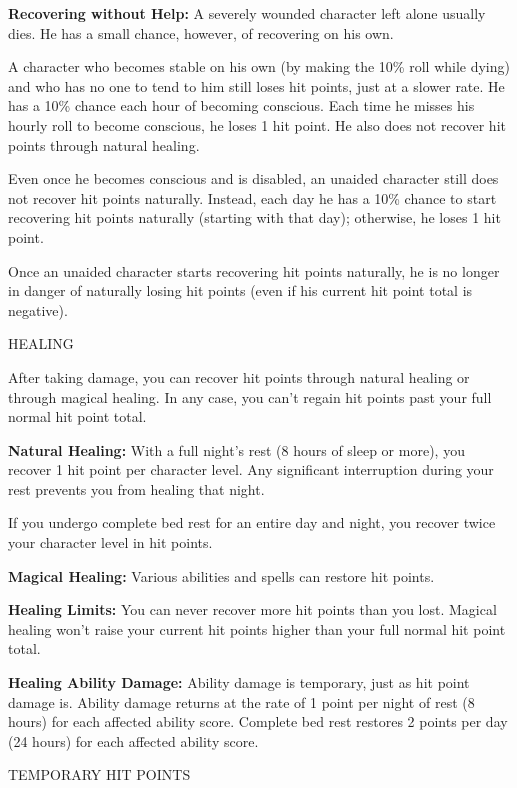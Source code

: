 \documentclass{article}
\begin{document}
\textbf{Recovering without Help:} A severely wounded character left alone usually 
dies. He has a small chance, however, of recovering on his own. 

A character who becomes stable on his own (by making the 10\% roll while dying) 
and who has no one to tend to him still loses hit points, just at a slower rate. 
He has a 10\% chance each hour of becoming conscious. Each time he misses his hourly 
roll to become conscious, he loses 1 hit point. He also does not recover hit points 
through natural healing.

Even once he becomes conscious and is disabled, an unaided character still does 
not recover hit points naturally. Instead, each day he has a 10\% chance to start 
recovering hit points naturally (starting with that day); otherwise, he loses 1 
hit point.

Once an unaided character starts recovering hit points naturally, he is no longer 
in danger of naturally losing hit points (even if his current hit point total is 
negative).

\vspace{12pt}
HEALING

After taking damage, you can recover hit points through natural healing or through 
magical healing. In any case, you can't regain hit points past your full normal 
hit point total.

\textbf{Natural Healing:} With a full night's rest (8 hours of sleep or more), 
you recover 1 hit point per character level. Any significant interruption during 
your rest prevents you from healing that night.

If you undergo complete bed rest for an entire day and night, you recover twice 
your character level in hit points. 

\textbf{Magical Healing:} Various abilities and spells can restore hit points.

\textbf{Healing Limits:} You can never recover more hit points than you lost. Magical 
healing won't raise your current hit points higher than your full normal hit point 
total.

\textbf{Healing Ability Damage:} Ability damage is temporary, just as hit point 
damage is. Ability damage returns at the rate of 1 point per night of rest (8 hours) 
for each affected ability score. Complete bed rest restores 2 points per day (24 
hours) for each affected ability score.

\vspace{12pt}
TEMPORARY HIT POINTS
\end{document}
